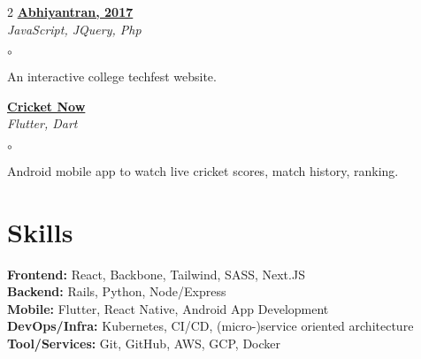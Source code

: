 \documentclass[margin,line]{resume}
\begin{document}
\begin{resume}
\begin{multicols}{2}
        \textbf{\href{https://github.com/sangamcse/abhiyantran-2017}{Abhiyantran, 2017}}                            \\%
        \emph{JavaScript, JQuery, Php}
        \begin{list}{$\circ$}{}
            \item An interactive college techfest website.
        \end{list}

        \textbf{\href{https://play.google.com/store/apps/details?id=com.sports.cricket_now}{Cricket Now}}           \\%
        \emph{Flutter, Dart}
        \begin{list}{$\circ$}{}
            \item Android mobile app to watch live cricket scores, match history, ranking.
        \end{list}
    \end{multicols}

    \section{\mysidestyle Skills}

    \textbf{Frontend:} React, Backbone, Tailwind, SASS, Next.JS                                                     \\%
    \textbf{Backend:} Rails, Python, Node/Express                                                                   \\%
    \textbf{Mobile:} Flutter, React Native, Android App Development                                                 \\%
    \textbf{DevOps/Infra:} Kubernetes, CI/CD, (micro-)service oriented architecture                                 \\%
    \textbf{Tool/Services:} Git, GitHub, AWS, GCP, Docker                                                             %
\end{resume}
\end{document}

